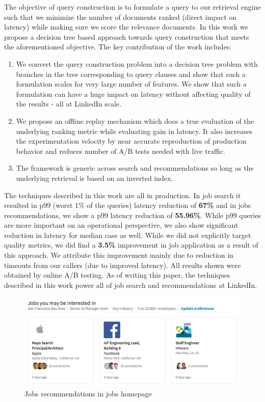 The objective of query construction is to formulate a query to our retrieval
engine such that we minimize the number of documents ranked (direct impact on
latency) while making sure we score the relevance documents. In this work we
propose a decision tree based approach towards query construction that meets the
aforementioned objective. The key contribution of the work includes: 
\begin{enumerate}
        \item We convert the query construction problem into a decision tree
            problem with branches in the tree corresponding to query clauses 
            and show that such a formulation scales for very large number of features. 
            We show that such a formulation can have a huge impact on latency
            without affecting quality of the results - all at LinkedIn scale.
        \item We propose an offline replay mechanism which does a true
            evaluation of the underlying ranking metric while evaluating gain
            in latency. It also increases the experimentation velocity by near
            accurate reproduction of production behavior and reduces number of
            A/B tests needed with live traffic.
        \item The framework is generic across search and recommendations so
            long as the underlying retrieval is based on an inverted index.
\end{enumerate}
The techniques described in this work are all in production. In job search it
resulted in p99 (worst 1\% of the queries) latency reduction of {\bf 67\%} 
and in jobs recommendations, we show a p99 latency reduction of {\bf 55.96\%}. While
p99 queries are more important on an operational perspective, we also show
significant reduction in latency for median case as well. While we did not
explicitly target quality metrics, we did find a {\bf 3.5\%} improvement in job
application as a result of this approach. We attribute this improvement mainly
due to reduction in timeouts from our callers (due to improved latency). All
results shown were obtained by online A/B testing. As of writing this paper, 
the techniques described in this work power all of job search and
recommendations at LinkedIn.


\begin{figure}
\includegraphics[width=\linewidth,height=\textheight,keepaspectratio]{jymbii.png}
\caption{Jobs recommendations in jobs homepage}
\label{fig:jymbii-jobs-home}
\end{figure}


